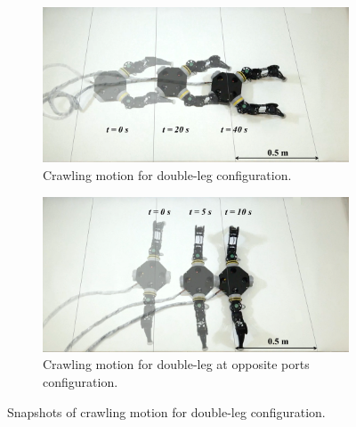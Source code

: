 \begin{enumerate}
\begin{figure}[h]
 \begin{subfigure}{1.0\textwidth}
 \begin{center}
  \includegraphics[width=110mm]{./fig/chap3/snapshot/double_snapshot3.png}
  \caption{Crawling motion for double-leg configuration.}\label{doublesnap1}
 \end{center}
 \end{subfigure}
 
 \begin{subfigure}{1.0\textwidth}
 \begin{center}
  \includegraphics[width=110mm]{./fig/chap3/snapshot/double_snapshot4.png}
  \caption{Crawling motion for double-leg at opposite ports configuration.}\label{doublesnap2}
\end{center}
\end{subfigure}
\vspace{-2mm}
\caption{Snapshots of crawling motion for double-leg configuration.}
\label{doublesnap}
\end{figure}





\end{enumerate}
